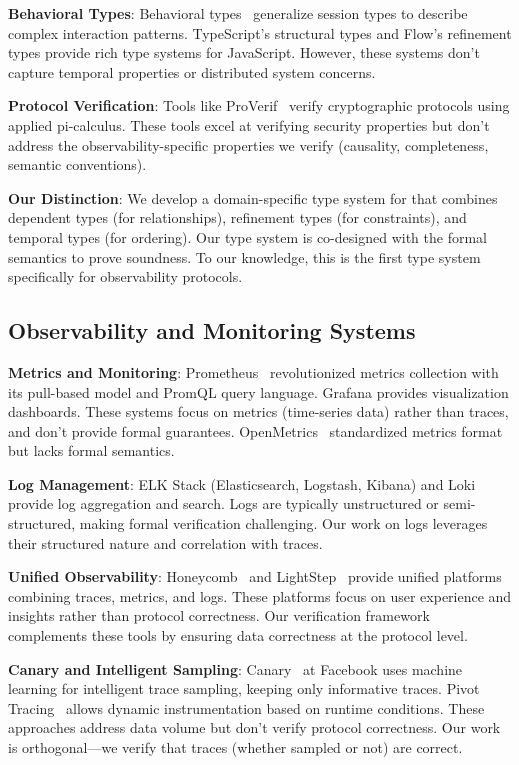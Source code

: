 \textbf{Behavioral Types}: Behavioral types~\cite{ancona2016behavioral} generalize session types to describe complex interaction patterns. TypeScript's structural types and Flow's refinement types provide rich type systems for JavaScript. However, these systems don't capture temporal properties or distributed system concerns.

\textbf{Protocol Verification}: Tools like ProVerif~\cite{blanchet2016proverif} verify cryptographic protocols using applied pi-calculus. These tools excel at verifying security properties but don't address the observability-specific properties we verify (causality, completeness, semantic conventions).

\textbf{Our Distinction}: We develop a domain-specific type system for \otlp that combines dependent types (for relationships), refinement types (for constraints), and temporal types (for ordering). Our type system is co-designed with the formal semantics to prove soundness. To our knowledge, this is the first type system specifically for observability protocols.

\subsection{Observability and Monitoring Systems}

\textbf{Metrics and Monitoring}: Prometheus~\cite{prometheus2012} revolutionized metrics collection with its pull-based model and PromQL query language. Grafana provides visualization dashboards. These systems focus on metrics (time-series data) rather than traces, and don't provide formal guarantees. OpenMetrics~\cite{openmetrics2018} standardized metrics format but lacks formal semantics.

\textbf{Log Management}: ELK Stack (Elasticsearch, Logstash, Kibana) and Loki~\cite{loki2018} provide log aggregation and search. Logs are typically unstructured or semi-structured, making formal verification challenging. Our work on \otlp logs leverages their structured nature and correlation with traces.

\textbf{Unified Observability}: Honeycomb~\cite{honeycomb2016} and LightStep~\cite{lightstep2015} provide unified platforms combining traces, metrics, and logs. These platforms focus on user experience and insights rather than protocol correctness. Our verification framework complements these tools by ensuring data correctness at the protocol level.

\textbf{Canary and Intelligent Sampling}: Canary~\cite{kaldor2017canopy} at Facebook uses machine learning for intelligent trace sampling, keeping only informative traces. Pivot Tracing~\cite{mace2015pivot} allows dynamic instrumentation based on runtime conditions. These approaches address data volume but don't verify protocol correctness. Our work is orthogonal---we verify that traces (whether sampled or not) are correct.

